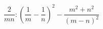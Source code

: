 \begin{ex}[type=expression]
	\begin{condition}
		\( \dfrac{2}{mn}:\left( \dfrac{1}{m}-\dfrac{1}{n} \right)^2-\dfrac{m^2+n^2}{(m-n)^2} \)
	\end{condition}
\end{ex}
